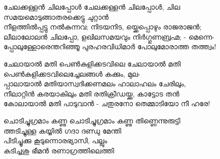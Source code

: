 \begin{enumerate}


\begin{slokam}{\VSr}{\VKG}{ചേലക്കള്ളൻ ചിലപ്പോള്‍}
ചേലക്കള്ളൻ ചിലപ്പോള്‍, ചില സമയമൊടുങ്ങാതരക്കെട്ടു ചുറ്റാൻ\\
നീളത്തിൽപ്പട്ടു നൽകുന്നവ; നിടയനിട, യ്ക്കെപ്പൊഴും രാജരാജൻ;\\
ലീലാലോലൻ ചിലപ്പോ, ളഖിലസമയവും നിർഗ്ഗുണബ്രഹ്മ; - മെന്നെ-\\
പ്പോലുള്ളോരെന്തറിഞ്ഞൂ പുരഹരവിധിമാർ പോലുമോരാത്ത തത്ത്വം!
\end{slokam}


\begin{slokam}{\VSv}{\VKG}{ചേലായാൽ മതി പെൺകുളിക്കടവിലെ}
ചേലായാൽ മതി പെൺകുളിക്കടവിലെച്ചേലങ്ങള്‍ കക്കും, മുല-\\
പ്പാലായാൽ മതിയാസ്വദിക്കണമലം ഹാലാഹലം ചേരിലും,\\
നീലാറ്റിൻ കരയാകിലും മതി രതിക്രീഡയ്ക്കു, കാട്ടോട തൻ\\
കോലായാൽ മതി പാടുവാൻ - ചതുരനോ തെമ്മാടിയോ നീ ഹരേ!
\end{slokam}


\begin{slokam}{\VBh}{\PKV}{ചൊടിച്ചുഗ്രമാം കണ്ണു}
ചൊടിച്ചുഗ്രമാം കണ്ണു തിണ്ണെന്നുരുട്ടി\\
ത്തടിച്ചുള്ള കയ്യിൽ ഗദാ ദണ്ഡു മേന്തി\\
പിടിച്ചൂക്കു കൂടുന്നൊരഭ്യാസി, പല്ലും\\
കടിച്ചശു ഭീമൻ രണാഗ്രത്തിലെത്തി
\end{slokam}



\end{enumerate}


